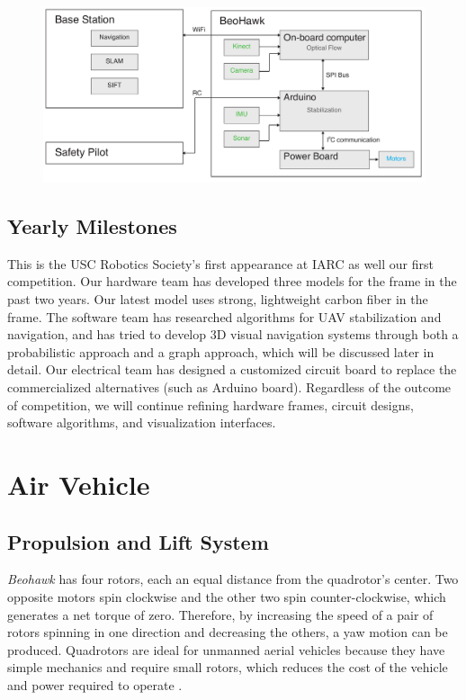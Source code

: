 \documentclass[12pt, letterpaper]{article}
\begin{document}
\begin{figure}[h]
\centering
\includegraphics[width=14cm]{images/beohawk-system-arch.pdf}
\label{fig:architecture}
\end{figure}

\subsection{Yearly Milestones}

This is the USC Robotics Society's first appearance at IARC as well our first competition. Our hardware team has developed three models for the frame in the past two years. Our latest model uses strong, lightweight carbon fiber in the frame. The software team has researched algorithms for UAV stabilization and navigation, and has tried to develop 3D visual navigation systems through both a probabilistic approach and a graph approach, which will be discussed later in detail. Our electrical team has designed a customized circuit board to replace the commercialized alternatives (such as Arduino board). Regardless of the outcome of competition, we will continue refining hardware frames, circuit designs, software algorithms, and visualization interfaces.


\section{Air Vehicle}

\subsection{Propulsion and Lift System}
\emph{Beohawk} has four rotors, each an equal distance from the quadrotor's center.  Two opposite motors spin clockwise and the other two spin counter-clockwise, which generates a net torque of zero.  Therefore, by increasing the speed of a pair of rotors spinning in one direction and decreasing the others, a yaw motion can be produced. Quadrotors are ideal for unmanned aerial vehicles because they have simple mechanics and require small rotors, which reduces the cost of the vehicle and power required to operate \cite{bib:quadrotor}.
\end{document}
